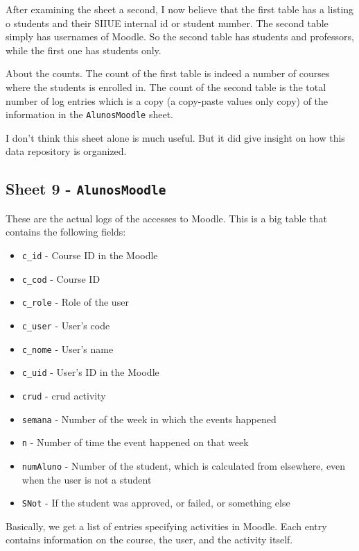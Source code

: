 After examining the sheet a second, I now believe that the first table has a
listing o students and their SIIUE internal id or student number. The second
table simply has usernames of Moodle. So the second table has students and
professors, while the first one has students only.

About the counts. The count of the first table is indeed a number of courses
where the students is enrolled in. The count of the second table is the total
number of log entries which is a copy (a copy-paste values only copy) of the
information in the \texttt{AlunosMoodle} sheet.

I don't think this sheet alone is much useful. But it did give insight on how
this data repository is organized.

\subsection{Sheet 9 - \texttt{AlunosMoodle}}

These are the actual logs of the accesses to Moodle. This is a big table that
contains the following fields:

\begin{itemize}
    \item \texttt{c\_id} - Course ID in the Moodle
    \item \texttt{c\_cod} - Course ID
    \item \texttt{c\_role} - Role of the user
    \item \texttt{c\_user} - User's code
    \item \texttt{c\_nome} - User's name
    \item \texttt{c\_uid} - User's ID in the Moodle
    \item \texttt{crud} - \gls{crud} activity
    \item \texttt{semana} - Number of the week in which the events happened
    \item \texttt{n} - Number of time the event happened on that week
    \item \texttt{numAluno} - Number of the student, which is calculated from
        elsewhere, even when the user is not a student
    \item \texttt{SNot} - If the student was approved, or failed, or something
        else
\end{itemize}

Basically, we get a list of entries specifying activities in Moodle. Each entry
contains information on the course, the user, and the activity itself.

